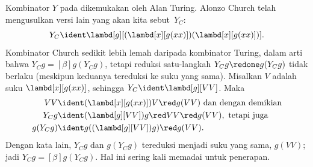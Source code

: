 \documentclass[../../../include/open-logic-section]{subfiles}
\begin{document}
Kombinator $Y$ pada  dikemukakan oleh Alan Turing. Alonzo
Church telah mengusulkan versi lain yang akan kita sebut~$Y_C$:
\[
Y_C \ident \lambd[g][(\lambd[x][g(xx)])(\lambd[x][g(xx)])].
\]
Kombinator Church sedikit lebih lemah daripada kombinator Turing, dalam arti
bahwa $Y_Cg \equal[\beta] g(Y_Cg)$, tetapi reduksi satu-langkah
$Y_Cg \redone g(Y_Cg)$ tidak berlaku (meskipun keduanya tereduksi ke suku
yang sama). Misalkan $V$ adalah suku $\lambd[x][g(xx)]$, sehingga
$Y_C \ident \lambd[g][VV]$. Maka
\begin{align*}
  VV & \ident (\lambd[x][g(xx)])V \red g(VV)
  \text{ dan dengan demikian}\\
  Y_C g & \ident (\lambd[g][VV])g \red VV \red g(VV), \text{ tetapi juga}\\
  g(Y_C g) & \ident g((\lambd[g][VV])g) \red g(VV).
\end{align*}
Dengan kata lain, $Y_Cg$ dan $g(Y_Cg)$ tereduksi menjadi suku yang sama,
$g(VV)$; jadi $Y_Cg \equal[\beta] g(Y_Cg)$. Hal ini sering kali memadai untuk
penerapan.
\end{document}
